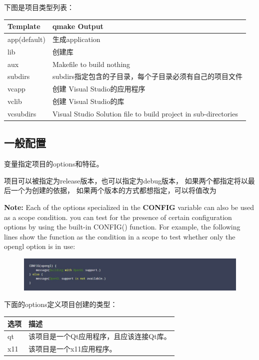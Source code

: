下图是项目类型列表：
\begin{table}[htbp]
  \centering
  \begin{tabular}{|l|l|} \hline
    Template          & qmake Output \\\hline
    app(default)      & 生成application \\\hline
    lib               & 创建库 \\\hline
    aux               & Makefile to build nothing \\\hline
    subdirs           & subdirs指定包含的子目录，每个子目录必须有自己的项目文件 \\\hline
    vcapp             & 创建 Visual Studio的应用程序 \\\hline
    vclib             & 创建 Visual Studio的库  \\\hline
    vcsubdirs         & Visual Studio Solution file to build project in sub-directories \\\hline
  \end{tabular}
\end{table}


\subsection{一般配置}
变量{\color{seagreen}{CONFIG}}指定项目的options和特征。

项目可以被指定为release版本，也可以指定为debug版本，%
如果两个都指定将以最后一个为创建的依据，%
如果两个版本的方式都想指定，可以将值改为{\color{seagreen}{debug\_and\_release}}

\textbf{Note:} Each of the options specialized in the \textbf{CONFIG} variable can also be used as a scope condition.%
you can test for the presence of certain configuration options by using the built-in {\color{seagreen}CONFIG()} function.%
For example, the following lines show the function as the condition in a scope to test whether only the opengl option is in use:
\begin{figure}[htbp]
  \centering
  \includegraphics[width=\textwidth]{qmake/images/opengl}
\end{figure}

下面的options定义项目创建的类型：
\begin{table}[htbp]
  \centering
  \begin{tabular}{|l|l|} \hline
    \textbf{选项}   & \textbf{描述} \\\hline
    qt              & 该项目是一个Qt应用程序，且应该连接Qt库。 \\\hline
    x11             & 该项目是一个x11应用程序。\\\hline
  \end{tabular}
\end{table}

